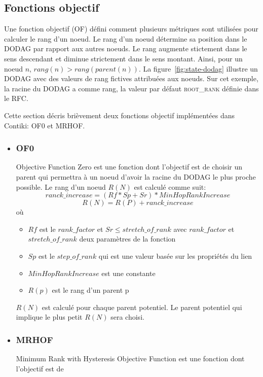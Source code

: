 \subsection*{Fonctions objectif}
Une fonction objectif (OF) défini comment plusieurs métriques sont utilisées pour calculer le rang d'un noeud. Le rang d'un noeud détermine sa position dans le DODAG par rapport aux autres noeuds.
Le rang augmente stictement dans le sens descendant et diminue strictement dans le sens montant. Ainsi, pour un noeud $n$, $rang(n)>rang(parent(n))$. La figure~\ref{fig:state-dodag} illustre un DODAG avec des valeurs de rang fictives attribuées aux noeuds. Sur cet exemple, la racine du DODAG a comme rang, la valeur par défaut \textsc{root\_rank} définie dans le RFC.

Cette section décris brièvement deux fonctions objectif implémentées dans Contiki: OF0 et MRHOF.
\begin{itemize}
    \item \subsubsection*{OF0}%
            Objective Function Zero est une fonction dont l'objectif est de choisir un parent qui permettra à un noeud d'avoir la racine du DODAG le plus proche possible. Le rang d'un noeud $R(N)$ est calculé comme suit:
                \[ranck\_increase = (Rf * Sp + Sr) * MinHopRankIncrease\]
                \[R(N) = R(P) + ranck\_increase\]
                où
                \begin{itemize}
                    \item $Rf$ est le $rank\_factor$ et $Sr \leq stretch\_of\_rank$ avec $rank\_factor$ et $stretch\_of\_rank$ deux paramètres de la fonction
                    \item $Sp$ est le $step\_of\_rank$ qui est une valeur basée sur les propriétés du lien
                    \item $MinHopRankIncrease$ est une constante
                    \item $R(p)$ est le rang d'un parent p
                \end{itemize}
                $R(N)$ est calculé pour chaque parent potentiel. Le parent potentiel qui implique le plus petit $R(N)$ sera choisi.
                
    \item \subsubsection*{MRHOF}%
            Minimum Rank with Hysteresis Objective Function est une fonction dont l'objectif est de 
\end{itemize}

